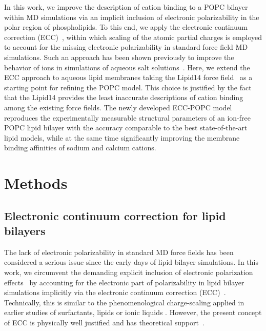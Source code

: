 \documentclass[journal=jpcbfk,manuscript=article]{achemso}
\begin{document}
In this work, we improve the description of cation binding to a POPC bilayer within MD simulations 
via an implicit inclusion of electronic polarizability in the polar region of phospholipids. 
To this end, we apply the electronic continuum correction (ECC)~\cite{leontyev11}, 
within which scaling of the atomic partial charges is employed to account for the missing electronic polarizability in standard force field MD simulations. 
Such an approach has been shown previously to improve the behavior of ions in simulations of aqueous salt solutions~\cite{martinek17, Pluharova2014, kohagen14, kohagen16}. Here, we extend the ECC approach to aqueous lipid membranes taking the Lipid14 force field~\cite{dickson14} as a starting point for refining the POPC model. This choice is justified by the fact that the Lipid14 provides the least inaccurate descriptions of cation binding among the existing force fields\cite{catte16}. 
The newly developed ECC-POPC model reproduces the experimentally
measurable structural parameters of an ion-free POPC lipid bilayer with the accuracy comparable to the best state-of-the-art lipid models, while at the same time significantly improving the membrane binding affinities of sodium and calcium cations.

\section{Methods}

\subsection{Electronic continuum correction for lipid bilayers}\label{section:ecc}
The lack of electronic polarizability in standard MD force fields has been considered a serious issue since the early days of lipid bilayer simulations. In this work, we circumvent the demanding explicit inclusion of electronic polarization effects~\cite{lucas12, chowdhary13} by accounting for the electronic part of polarizability in lipid bilayer simulations implicitly via the electronic continuum correction (ECC)~\cite{leontyev11}. Technically, this is similar to the phenomenological charge-scaling applied in earlier studies of surfactants, lipids or ionic liquids \cite{jonsson86, egberts94, beichel14}. However, the present concept of ECC is physically well justified and has theoretical support~\cite{leontyev09, leontyev10, leontyev11, leontyev14}.
\end{document}
